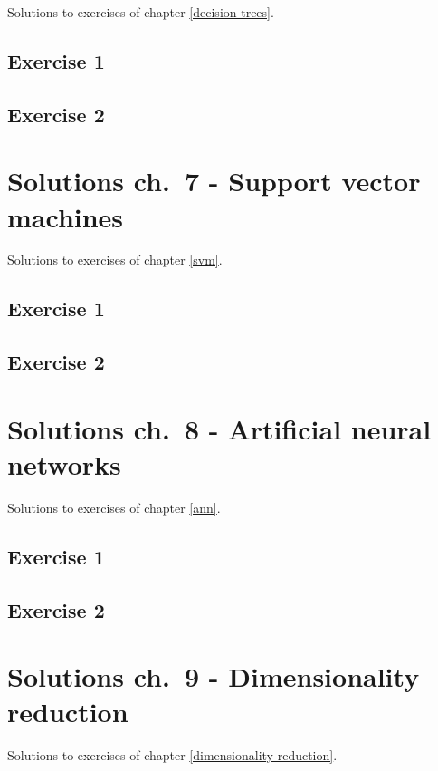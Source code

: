 \documentclass[]{book}
\theoremstyle{definition}
\theoremstyle{definition}
\theoremstyle{definition}
\theoremstyle{remark}
\begin{document}
Solutions to exercises of chapter \ref{decision-trees}.

\section{Exercise 1}\label{exercise-1-3}

\section{Exercise 2}\label{exercise-2-3}

\chapter{Solutions ch.~7 - Support vector machines}\label{solutions-svm}

Solutions to exercises of chapter \ref{svm}.

\section{Exercise 1}\label{exercise-1-4}

\section{Exercise 2}\label{exercise-2-4}

\chapter{Solutions ch.~8 - Artificial neural
networks}\label{solutions-ann}

Solutions to exercises of chapter \ref{ann}.

\section{Exercise 1}\label{exercise-1-5}

\section{Exercise 2}\label{exercise-2-5}

\chapter{Solutions ch.~9 - Dimensionality
reduction}\label{solutions-dimensionality-reduction}

Solutions to exercises of chapter \ref{dimensionality-reduction}.
\end{document}

